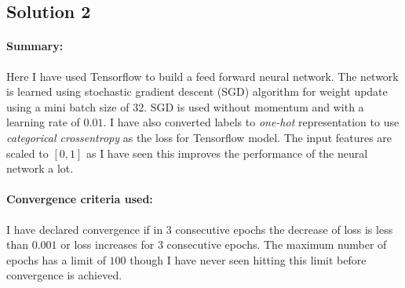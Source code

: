 \subsection*{Solution 2}
\paragraph{Summary:} Here I have used Tensorflow to build a feed forward neural network. The network is learned using stochastic gradient descent (SGD) algorithm for weight update using a mini batch size of $32$. SGD is used without momentum and with a learning rate of $0.01$. I have also converted labels to \textit{one-hot} representation to use \textit{categorical crossentropy} as the loss for Tensorflow model. The input features are scaled to $[0, 1]$ as I have seen this improves the performance of the neural network a lot.
\paragraph{Convergence criteria used:} I have declared convergence if in $3$ consecutive epochs the decrease of loss is less than $0.001$ or loss increases for $3$ consecutive epochs. The maximum number of epochs has a limit of $100$ though I have never seen hitting this limit before convergence is achieved.
